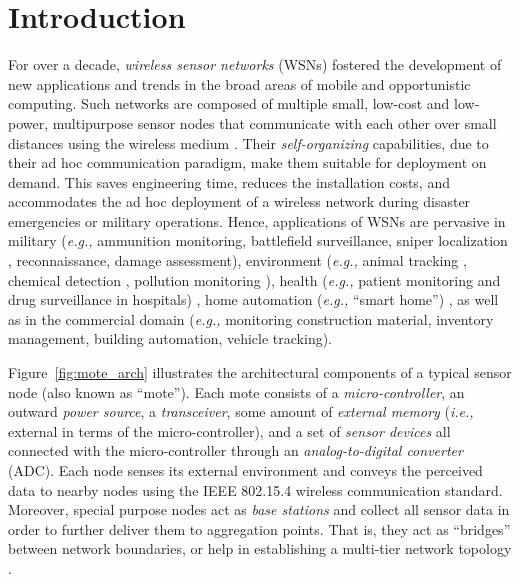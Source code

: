 \section{Introduction}
\label{sec:whitepaper_introduction}

For over a decade, \textit{wireless sensor networks} (WSNs) fostered the
development of new applications and trends in the broad areas of mobile
and opportunistic computing. Such networks are composed of multiple small,
low-cost and low-power, multipurpose sensor nodes that communicate with
each other over small distances using the wireless medium
\cite{culler:2004}. Their \textit{self-organizing} capabilities, due to
their ad hoc communication paradigm, make them suitable for deployment on
demand. This saves engineering time, reduces the installation costs, and
accommodates the ad hoc deployment of a wireless network during disaster
emergencies or military operations. Hence, applications of WSNs are
pervasive in military (\textit{e.g.,} ammunition monitoring, battlefield
surveillance, sniper localization \cite{simon:2004}, reconnaissance,
damage assessment), environment (\textit{e.g.,} animal tracking
\cite{szewczyk:2004}, chemical detection \cite{allred:2007}, pollution
monitoring \cite{hartung:2006}), health (\textit{e.g.,} patient
monitoring and drug surveillance in hospitals) \cite{lorincz:2008}, home
automation (\textit{e.g.,} ``smart home'') \cite{kim:2008}, as well as in
the commercial domain (\textit{e.g.,} monitoring construction material,
inventory management, building automation, vehicle tracking).

Figure~\ref{fig:mote_arch} illustrates the architectural components of a
typical sensor node (also known as ``mote''). Each mote consists of a
\textit{micro-controller}, an outward \textit{power source}, a
\textit{transceiver}, some amount of \textit{external memory}
(\textit{i.e.,} external in terms of the micro-controller), and a set of
\textit{sensor devices} all connected with the micro-controller through an
\textit{analog-to-digital converter} (ADC). Each node senses its external
environment and conveys the perceived data to nearby nodes using the IEEE
802.15.4 wireless communication standard. Moreover, special purpose nodes
act as \textit{base stations} and collect all sensor data in order to
further deliver them to aggregation points. That is, they act as
``bridges'' between network boundaries, or help in establishing a
multi-tier network topology \cite{gnawali:2006}.

